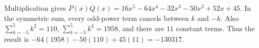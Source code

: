 Multiplication gives $P(x)Q(x)=16x^5-64x^4-32x^3-50x^2+52x+45$. In the symmetric sum, every odd-power term cancels between $k$ and $-k$. Also $\sum_{k=-5}^5k^2=110$, $\sum_{k=-5}^5k^4=1958$, and there are $11$ constant terms. Thus the result is $-64(1958)-50(110)+45(11)=\boxed{-130317}$.
